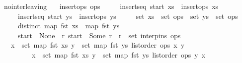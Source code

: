 \begin{isabelle}
\isamarkupfalse%
\ no{\isacharunderscore}interleaving{\isacharcolon}\isanewline
\ \ \ {\isachardoublequoteopen}insert{\isacharunderscore}ops\ ops{\isachardoublequoteclose}\isanewline
\ \ \ \ \ {\isachardoublequoteopen}insert{\isacharunderscore}seq\ start\ xs{\isachardoublequoteclose}\ \ {\isachardoublequoteopen}insert{\isacharunderscore}ops\ xs{\isachardoublequoteclose}\isanewline
\ \ \ \ \ {\isachardoublequoteopen}insert{\isacharunderscore}seq\ start\ ys{\isachardoublequoteclose}\ \ {\isachardoublequoteopen}insert{\isacharunderscore}ops\ ys{\isachardoublequoteclose}\isanewline
\ \ \ \ \ {\isachardoublequoteopen}set\ xs\ {\isasymsubseteq}\ set\ ops{\isachardoublequoteclose}\ \ {\isachardoublequoteopen}set\ ys\ {\isasymsubseteq}\ set\ ops{\isachardoublequoteclose}\isanewline
\ \ \ \ \ {\isachardoublequoteopen}distinct\ {\isacharparenleft}map\ fst\ xs\ {\isacharat}\ map\ fst\ ys{\isacharparenright}{\isachardoublequoteclose}\isanewline
\ \ \ \ \ {\isachardoublequoteopen}start\ {\isacharequal}\ None\ {\isasymor}\ {\isacharparenleft}{\isasymexists}r{\isachardot}\ start\ {\isacharequal}\ Some\ r\ {\isasymand}\ r\ {\isasymin}\ set\ {\isacharparenleft}interp{\isacharunderscore}ins\ ops{\isacharparenright}{\isacharparenright}{\isachardoublequoteclose}\isanewline
\ \ \ {\isachardoublequoteopen}{\isacharparenleft}{\isasymforall}x\ {\isasymin}\ set\ {\isacharparenleft}map\ fst\ xs{\isacharparenright}{\isachardot}\ {\isasymforall}y\ {\isasymin}\ set\ {\isacharparenleft}map\ fst\ ys{\isacharparenright}{\isachardot}\ list{\isacharunderscore}order\ ops\ x\ y{\isacharparenright}\ {\isasymor}\isanewline
\ \ \ \ \ \ \ \ \ {\isacharparenleft}{\isasymforall}x\ {\isasymin}\ set\ {\isacharparenleft}map\ fst\ xs{\isacharparenright}{\isachardot}\ {\isasymforall}y\ {\isasymin}\ set\ {\isacharparenleft}map\ fst\ ys{\isacharparenright}{\isachardot}\ list{\isacharunderscore}order\ ops\ y\ x{\isacharparenright}{\isachardoublequoteclose}
\end{isabelle}

